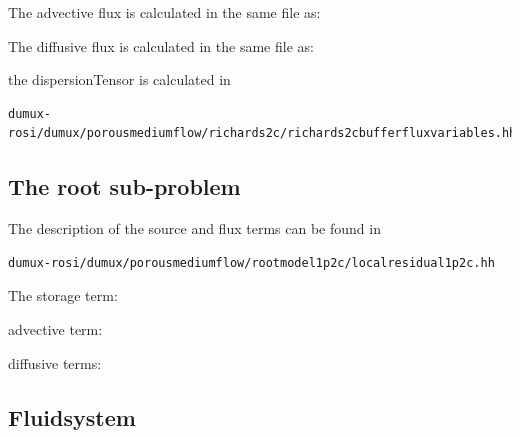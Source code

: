 	

The advective flux is calculated in the same file as:



The diffusive flux is calculated in the same file as:



the dispersionTensor is calculated in 

\begin{lstlisting}
dumux-rosi/dumux/porousmediumflow/richards2c/richards2cbufferfluxvariables.hh
\end{lstlisting}




\subsection*{The root sub-problem}

The description of the source and flux terms can be found in 

\begin{lstlisting}
dumux-rosi/dumux/porousmediumflow/rootmodel1p2c/localresidual1p2c.hh
\end{lstlisting}
The storage term: 



advective term:


diffusive terms:


\subsection*{Fluidsystem}


